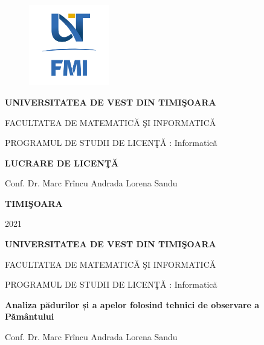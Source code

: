 \documentclass[12pt,a4paper]{article}
\theoremstyle{definition}
\theoremstyle{remark}
\begin{document}
\thispagestyle{empty}
\begin{center}
\begin{figure}[h!]
\vspace{-20pt}
\begin{center}
\includegraphics[width=100pt]{FMI-03.png}
\end{center}
\end{figure}


{\large{\bf UNIVERSITATEA DE VEST DIN TIMI\c SOARA

FACULTATEA DE MATEMATIC\u A \c SI INFORMATIC\u A

PROGRAMUL DE STUDII DE LICEN\c T\u A : Informatic\u a  }}

\vspace{120pt}
{\huge {\bf LUCRARE DE LICEN\c T\u A}}

\vspace{150pt}
\end{center}

{\large{}

\noindent Conf. Dr. Marc Frîncu \hfill Andrada Lorena Sandu}

\vfill
\begin{center}
{\bf TIMI\c SOARA

2021}
\end{center}
\newpage
\thispagestyle{empty}
\begin{center}
{\large{\bf UNIVERSITATEA DE VEST DIN TIMI\c SOARA

FACULTATEA DE MATEMATIC\u A \c SI INFORMATIC\u A


PROGRAMUL DE STUDII DE LICEN\c T\u A : Informatic\u a  }}

\vspace{120pt}
{\huge {\bf Analiza pădurilor și a apelor folosind tehnici de observare a Pământului}}

\vspace{150pt}
\end{center}

{\large{}

\noindent Conf. Dr. Marc Frîncu \hfill Andrada Lorena Sandu}
\end{document}
